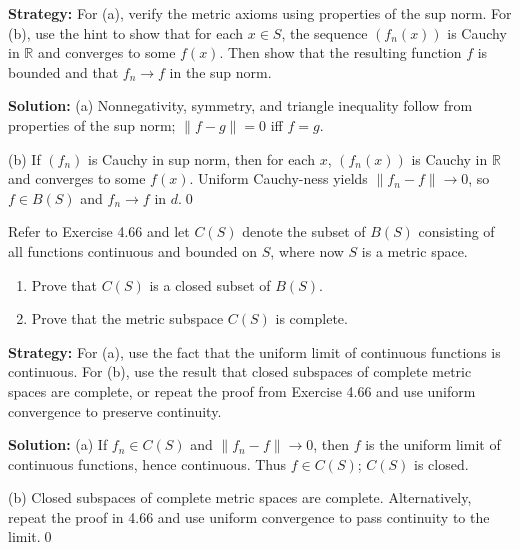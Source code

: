 \noindent\textbf{Strategy:} For (a), verify the metric axioms using properties of the sup norm. For (b), use the hint to show that for each $x \in S$, the sequence $(f_n(x))$ is Cauchy in $\mathbb{R}$ and converges to some $f(x)$. Then show that the resulting function $f$ is bounded and that $f_n \to f$ in the sup norm.

\bigskip\noindent\textbf{Solution:}
(a) Nonnegativity, symmetry, and triangle inequality follow from properties of the sup norm; $\|f-g\|=0$ iff $f=g$.

(b) If $(f_n)$ is Cauchy in sup norm, then for each $x$, $(f_n(x))$ is Cauchy in $\mathbb{R}$ and converges to some $f(x)$. Uniform Cauchy-ness yields $\|f_n-f\|\to 0$, so $f\in B(S)$ and $f_n\to f$ in $d$.\qed



\begin{problembox}
\begin{problemstatement}
Refer to Exercise 4.66 and let $C(S)$ denote the subset of $B(S)$ consisting of all functions continuous and bounded on $S$, where now $S$ is a metric space.
\begin{enumerate}[label=(\alph*)]
\item Prove that $C(S)$ is a closed subset of $B(S)$.
\item Prove that the metric subspace $C(S)$ is complete.
\end{enumerate}
\end{problemstatement}
\end{problembox}

\noindent\textbf{Strategy:} For (a), use the fact that the uniform limit of continuous functions is continuous. For (b), use the result that closed subspaces of complete metric spaces are complete, or repeat the proof from Exercise 4.66 and use uniform convergence to preserve continuity.

\bigskip\noindent\textbf{Solution:}
(a) If $f_n\in C(S)$ and $\|f_n-f\|\to 0$, then $f$ is the uniform limit of continuous functions, hence continuous. Thus $f\in C(S)$; $C(S)$ is closed.

(b) Closed subspaces of complete metric spaces are complete. Alternatively, repeat the proof in 4.66 and use uniform convergence to pass continuity to the limit.\qed



